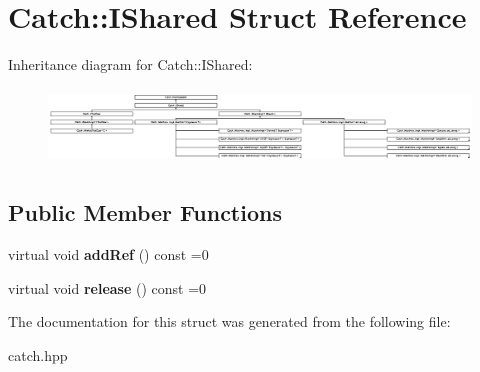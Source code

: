 \hypertarget{structCatch_1_1IShared}{}\section{Catch\+:\+:I\+Shared Struct Reference}
\label{structCatch_1_1IShared}
Inheritance diagram for Catch\+:\+:I\+Shared\+:\begin{figure}[H]
\begin{center}
\leavevmode
\includegraphics[height=2.004474cm]{structCatch_1_1IShared}
\end{center}
\end{figure}
\subsection*{Public Member Functions}
\begin{DoxyCompactItemize}
\item 
virtual void {\bfseries add\+Ref} () const  =0\hypertarget{structCatch_1_1IShared_ade3e1cd5df74b030058e201ffec156e5}{}\label{structCatch_1_1IShared_ade3e1cd5df74b030058e201ffec156e5}

\item 
virtual void {\bfseries release} () const  =0\hypertarget{structCatch_1_1IShared_a42030b50ca8aa628b48a37e51dd55d29}{}\label{structCatch_1_1IShared_a42030b50ca8aa628b48a37e51dd55d29}

\end{DoxyCompactItemize}


The documentation for this struct was generated from the following file\+:\begin{DoxyCompactItemize}
\item 
catch.\+hpp\end{DoxyCompactItemize}

